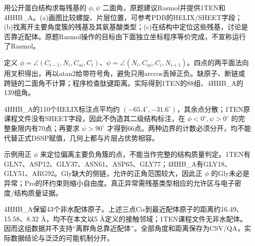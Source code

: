 \begin{exercise}
用公开蛋白结构求每残基的 $\phi,\psi$ 二面角，原题建议Rasmol并提供1TEN和4HHB\_A。(a)画图比较螺旋、片层位置，可参考PDB的HELIX/SHEET字段；(b)找离开主要角度簇的残基及其氨基酸类型；(c)在结构中定位这些残基，讨论是否靠近配体。原题Rasmol操作的目标由下面独立坐标程序等价完成，不宣称运行了Rasmol。
\end{exercise}
\begin{solution}
定义 $\phi=\angle(C_{i-1},N_i,C_{\alpha i},C_i)$、$\psi=\angle(N_i,C_{\alpha i},C_i,N_{i+1})$。四点的两平面法向用叉积得出，再以atan2给带符号角，避免只用arccos丢掉正负。缺原子、断链或跨链的二面角不计算；程序检查肽键距离。实际得到1TEN的88组、4HHB\_A的139组角。

4HHB\_A的110个HELIX标注点平均约 $(-65.4^\circ,-31.6^\circ)$，其余点分散；1TEN原课程文件没有SHEET字段，因此不伪造其二级结构标注，在 $\phi<0^\circ,\psi>0^\circ$ 的完整象限内有70点；再要求 $\psi>90^\circ$ 才得到66点。两种边界的计数必须分开，均不能代替正式DSSP赋值，几何上都与片层占优势相容。
\begin{center}\end{center}
示例用正 $\phi$ 来定位偏离主要负角簇的点，不能当作完整的结构质量判定。1TEN有GLN7、ASP12、GLY37、ASN61、ASP65、GLY77；4HHB\_A有GLY18、GLY51、ARG92。Gly缺大的侧链，允许的正角范围较大，因此正 $\phi$ 的Gly未必是异常；Pro的环约束则缩小自由度。真正异常需残基类型相应的允许区与电子密度/结构质量证据。

4HHB\_A保留43个非水配体原子。上述三点C$\alpha$到最近配体原子的距离约16.49、15.58、8.32 \AA{}，均不在本文以5 \AA{}定义的接触邻域；1TEN课程文件无非水配体。因而这组数据并不支持“离群角总靠近配体”。全部角度和距离保存为CSV/QA，实际数据结论与泛泛的可能机制分开。
\end{solution}

